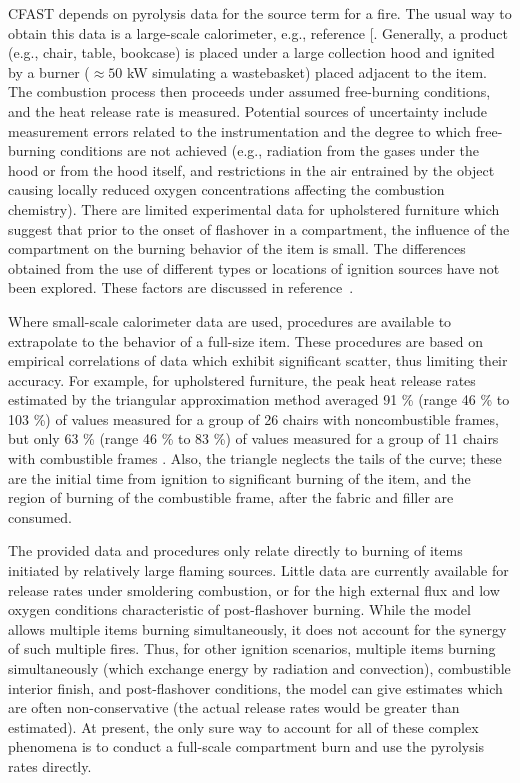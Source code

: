 CFAST depends on pyrolysis data for the source term for a fire. The usual way to obtain this data is a large-scale calorimeter, e.g., reference [\cite{Bryant:2003}. Generally, a product (e.g., chair, table, bookcase) is placed under a large collection hood and ignited by a burner ($\approx 50$ kW simulating a wastebasket) placed adjacent to the item.  The combustion process then proceeds under assumed free-burning conditions, and the heat release rate is measured.  Potential sources of uncertainty include measurement errors related to the instrumentation and the degree to which free-burning conditions are not achieved (e.g., radiation from the gases under the hood or from the hood itself, and restrictions in the air entrained by the object causing locally reduced oxygen concentrations affecting the combustion chemistry).  There are limited experimental data for upholstered furniture which suggest that prior to the onset of flashover in a compartment, the influence of the compartment on the burning behavior of the item is small.  The differences obtained from the use of different types or locations of ignition sources have not been explored. These factors are discussed in reference~\cite{Babrauskas:1982}.

Where small-scale calorimeter data are used, procedures are available to extrapolate to the behavior of a full-size item.  These procedures are based on empirical correlations of data which exhibit significant scatter, thus limiting their accuracy.  For example, for upholstered furniture, the peak heat release rates estimated by the triangular approximation method averaged 91 \% (range 46 \% to 103 \%) of values measured for a group of 26 chairs with noncombustible frames, but only 63 \% (range 46 \% to 83 \%) of values measured for a group of 11 chairs with combustible frames \cite{Babrauskas:1985}.  Also, the triangle neglects the tails of the curve; these are the initial time from ignition to significant burning of the item, and the region of burning of the combustible frame, after the fabric and filler are consumed.

The provided data and procedures only relate directly to burning of items initiated by relatively large flaming sources.  Little data are currently available for release rates under smoldering combustion, or for the high external flux and low oxygen conditions characteristic of post-flashover burning.  While the model allows multiple items burning simultaneously, it does not account for the synergy of such multiple fires.  Thus, for other ignition scenarios, multiple items burning simultaneously (which exchange energy by radiation and convection), combustible interior finish, and post-flashover conditions, the model can give estimates which are often non-conservative (the actual release rates would be greater than estimated).  At present, the only sure way to account for all of these complex phenomena is to conduct a full-scale compartment burn and use the pyrolysis rates directly.


